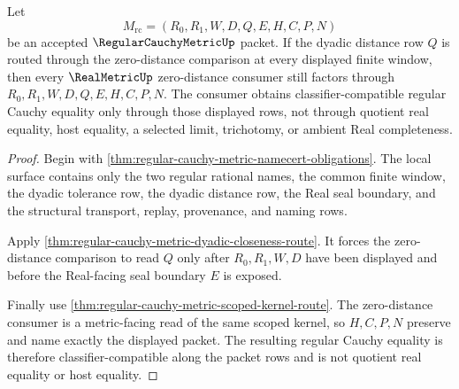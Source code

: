 \begin{theorem}
\label{thm:regular-cauchy-metric-separated-zero-route}
Let
$$
M_{\mathrm{rc}}=(R_0,R_1,W,D,Q,E,H,C,P,N)
$$
be an accepted $\RegularCauchyMetricUp$ packet. If the dyadic distance row $Q$
is routed through the zero-distance comparison at every displayed finite
window, then every $\RealMetricUp$ zero-distance consumer still factors through
$R_0,R_1,W,D,Q,E,H,C,P,N$. The consumer obtains classifier-compatible regular
Cauchy equality only through those displayed rows, not through quotient real
equality, host equality, a selected limit, trichotomy, or ambient Real
completeness.
\end{theorem}
\begin{proof}
Begin with \autoref{thm:regular-cauchy-metric-namecert-obligations}. The local
surface contains only the two regular rational names, the common finite window,
the dyadic tolerance row, the dyadic distance row, the Real seal boundary, and
the structural transport, replay, provenance, and naming rows.

Apply \autoref{thm:regular-cauchy-metric-dyadic-closeness-route}. It forces the
zero-distance comparison to read $Q$ only after $R_0,R_1,W,D$ have been
displayed and before the Real-facing seal boundary $E$ is exposed.

Finally use \autoref{thm:regular-cauchy-metric-scoped-kernel-route}. The
zero-distance consumer is a metric-facing read of the same scoped kernel, so
$H,C,P,N$ preserve and name exactly the displayed packet. The resulting
regular Cauchy equality is therefore classifier-compatible along the packet
rows and is not quotient real equality or host equality.
\end{proof}

\begin{closurestatus}{\RegularCauchyMetricUp}
  \theoryclosure{\seedClosure}
  \formalstatus{\unformalizedV}
\end{closurestatus}
